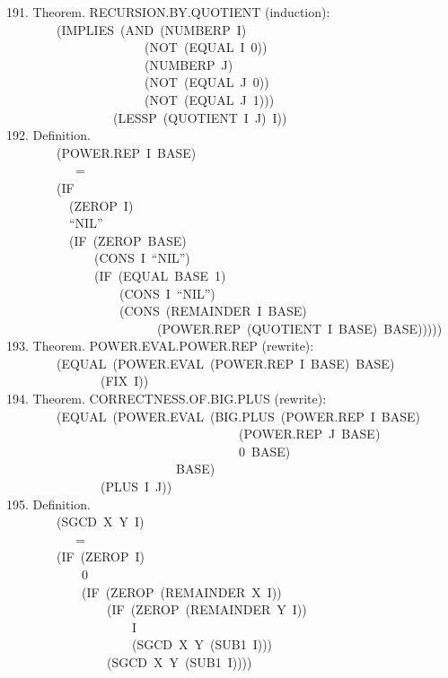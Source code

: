 \documentclass[10pt]{book}
\newenvironment{pubasis}{\begin{flushleft}}{\end{flushleft}}
\begin{document}
\begin{pubasis}
191.    Theorem.  RECURSION.BY.QUOTIENT (induction):\\
~~~~~~~~(IMPLIES~(AND~(NUMBERP~I)\\
~~~~~~~~~~~~~~~~~~~~~~(NOT~(EQUAL~I~0))\\
~~~~~~~~~~~~~~~~~~~~~~(NUMBERP~J)\\
~~~~~~~~~~~~~~~~~~~~~~(NOT~(EQUAL~J~0))\\
~~~~~~~~~~~~~~~~~~~~~~(NOT~(EQUAL~J~1)))\\
~~~~~~~~~~~~~~~~~(LESSP~(QUOTIENT~I~J)~I))\\

192.    Definition.\\
~~~~~~~~(POWER.REP~I~BASE)\\
~~~~~~~~~~~=\\
~~~~~~~~(IF\\
~~~~~~~~~~(ZEROP~I)\\
~~~~~~~~~~``NIL''\\
~~~~~~~~~~(IF~(ZEROP~BASE)\\
~~~~~~~~~~~~~~(CONS~I~``NIL'')\\
~~~~~~~~~~~~~~(IF~(EQUAL~BASE~1)\\
~~~~~~~~~~~~~~~~~~(CONS~I~``NIL'')\\
~~~~~~~~~~~~~~~~~~(CONS~(REMAINDER~I~BASE)\\
~~~~~~~~~~~~~~~~~~~~~~~~(POWER.REP~(QUOTIENT~I~BASE)~BASE)))))\\

193.    Theorem.  POWER.EVAL.POWER.REP (rewrite):\\
~~~~~~~~(EQUAL~(POWER.EVAL~(POWER.REP~I~BASE)~BASE)\\
~~~~~~~~~~~~~~~(FIX~I))\\

194.    Theorem.  CORRECTNESS.OF.BIG.PLUS (rewrite):\\
~~~~~~~~(EQUAL~(POWER.EVAL~(BIG.PLUS~(POWER.REP~I~BASE)\\
~~~~~~~~~~~~~~~~~~~~~~~~~~~~~~~~~~~~~(POWER.REP~J~BASE)\\
~~~~~~~~~~~~~~~~~~~~~~~~~~~~~~~~~~~~~0~BASE)\\
~~~~~~~~~~~~~~~~~~~~~~~~~~~BASE)\\
~~~~~~~~~~~~~~~(PLUS~I~J))\\

195.    Definition.\\
~~~~~~~~(SGCD~X~Y~I)\\
~~~~~~~~~~~=\\
~~~~~~~~(IF~(ZEROP~I)\\
~~~~~~~~~~~~0\\
~~~~~~~~~~~~(IF~(ZEROP~(REMAINDER~X~I))\\
~~~~~~~~~~~~~~~~(IF~(ZEROP~(REMAINDER~Y~I))\\
~~~~~~~~~~~~~~~~~~~~I\\
~~~~~~~~~~~~~~~~~~~~(SGCD~X~Y~(SUB1~I)))\\
~~~~~~~~~~~~~~~~(SGCD~X~Y~(SUB1~I))))\\


\end{pubasis}
\end{document}
